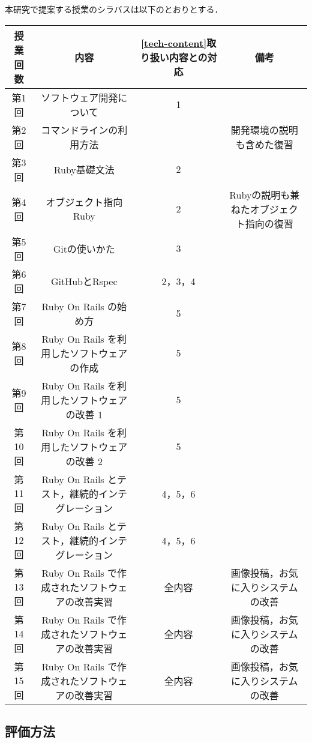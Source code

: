 本研究で提案する授業のシラバスは以下のとおりとする．

\begin{table}[ht]
  \begin{center}
    \begin{tabular}{|c|c|c|c|}
      \hline
      授業回数 & 内容 & \ref{tech-content}取り扱い内容との対応 & 備考 \\
      \hline
      第1回 & ソフトウェア開発について & 1 &  \\
      \hline
      第2回 & コマンドラインの利用方法 &  &  開発環境の説明も含めた復習 \\
      \hline
      第3回 & Ruby基礎文法 &  2 &  \\
      \hline
      第4回 & オブジェクト指向Ruby & 2 & Rubyの説明も兼ねたオブジェクト指向の復習 \\
      \hline
      第5回 & Gitの使いかた & 3 & \\
      \hline
      第6回 & GitHubとRspec & 2，3，4 &  \\
      \hline
      第7回 & Ruby On Rails の始め方 & 5 &  \\
      \hline
      第8回 & Ruby On Rails を利用したソフトウェアの作成 & 5 & \\
      \hline
      第9回 & Ruby On Rails を利用したソフトウェアの改善 1 & 5 & \\
      \hline
      第10回 & Ruby On Rails を利用したソフトウェアの改善 2 & 5 & \\
      \hline
      第11回 & Ruby On Rails とテスト，継続的インテグレーション & 4，5，6 & \\
      \hline
      第12回 & Ruby On Rails とテスト，継続的インテグレーション & 4，5，6 & \\
      \hline
      第13回 & Ruby On Rails で作成されたソフトウェアの改善実習 & 全内容 & 画像投稿，お気に入りシステムの改善\\
      \hline
      第14回 & Ruby On Rails で作成されたソフトウェアの改善実習 & 全内容 & 画像投稿，お気に入りシステムの改善\\
      \hline
      第15回 & Ruby On Rails で作成されたソフトウェアの改善実習 & 全内容 & 画像投稿，お気に入りシステムの改善\\
      \hline
    \end{tabular}
  \end{center}
\end{table}

\subsection{評価方法}

